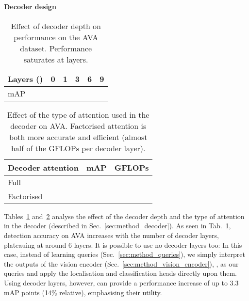 \documentclass[10pt,twocolumn,letterpaper]{article}
\def \paravspace {-0.7\baselineskip}
\begin{document}
\vspace{\paravspace}
\paragraph{Decoder design}

\begin{table}[t]
\centering
\caption{
	Effect of decoder depth on performance on the AVA dataset. Performance saturates at  layers.
}
\begin{tabular}{lccccc}
\toprule
Layers () & 0 & 1 & 3 & 6 & 9 \\
\midrule
mAP~ &  &  &  &  &   \\	
\bottomrule
\end{tabular}
\vspace{-1\baselineskip}
\label{tab:ablation_decoder_layers}

\end{table}


\begin{table}[t]
\vspace{-0.2\baselineskip}
\centering
\caption{Effect of the type of attention used in the decoder on AVA.
	Factorised attention is both more accurate and efficient (almost half of the GFLOPs per decoder layer).}
\begin{tabular}{lcc}
\toprule
Decoder attention & mAP & GFLOPs \\
\midrule
Full &  &  \\
Factorised &  &   \\
\bottomrule
\end{tabular}
\label{tab:ablation_decoder_attention}
\vspace{-0.5\baselineskip}
\end{table}

 
Tables~\ref{tab:ablation_decoder_layers} and~\ref{tab:ablation_decoder_attention} analyse the effect of the decoder depth and the type of attention in the decoder (described in Sec.~\ref{sec:method_decoder}).
As seen in Tab.~\ref{tab:ablation_decoder_layers}, detection accuracy on AVA increases with the number of decoder layers, plateauing at around 6 layers. It is possible to use no decoder layers too: In this case, instead of learning queries  (Sec.~\ref{sec:method_queries}), we simply interpret the outputs of the vision encoder (Sec.~\ref{sec:method_vision_encoder}), , as our queries and apply the localisation and classification heads directly upon them.
Using decoder layers, however, can provide a performance increase of up to 3.3 mAP points (14\% relative), emphasising their utility. 
\end{document}
